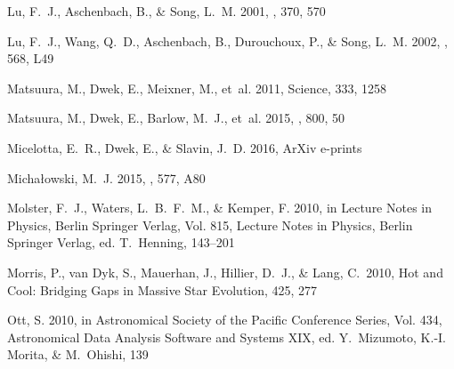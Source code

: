 \documentclass{emulateapj}
\begin{document}
\begin{thebibliography}{52}
{Lu}, F.~J., {Aschenbach}, B., \& {Song}, L.~M. 2001, \aap, 370, 570

{Lu}, F.~J., {Wang}, Q.~D., {Aschenbach}, B., {Durouchoux}, P., \& {Song},
  L.~M. 2002, \apjl, 568, L49

{Matsuura}, M., {Dwek}, E., {Meixner}, M., {et~al.} 2011, Science, 333, 1258

{Matsuura}, M., {Dwek}, E., {Barlow}, M.~J., {et~al.} 2015, \apj, 800, 50

{Micelotta}, E.~R., {Dwek}, E., \& {Slavin}, J.~D. 2016, ArXiv e-prints

{Micha{\l}owski}, M.~J. 2015, \aap, 577, A80

{Molster}, F.~J., {Waters}, L.~B.~F.~M., \& {Kemper}, F. 2010, in Lecture Notes
  in Physics, Berlin Springer Verlag, Vol. 815, Lecture Notes in Physics,
  Berlin Springer Verlag, ed. T.~{Henning}, 143--201
  
 Morris, P., van Dyk, S., Mauerhan, J., Hillier, D.~J., \& Lang, C.\ 2010, Hot and Cool: Bridging Gaps in Massive Star Evolution, 425, 277 

{Ott}, S. 2010, in Astronomical Society of the Pacific Conference Series, Vol.
  434, Astronomical Data Analysis Software and Systems XIX, ed. Y.~{Mizumoto},
  K.-I. {Morita}, \& M.~{Ohishi}, 139


\end{thebibliography}
\end{document}
